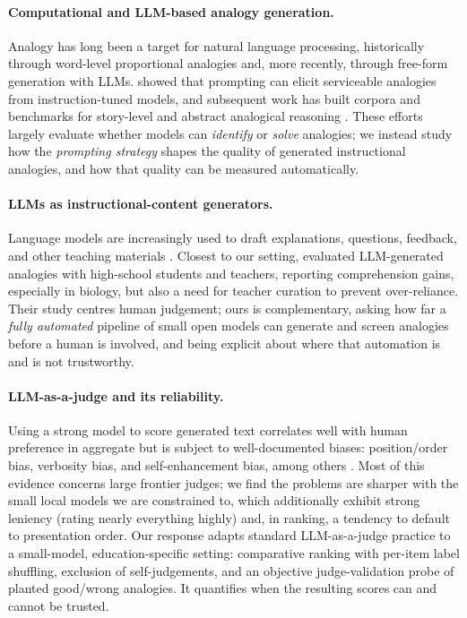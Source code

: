 \documentclass[11pt]{article}
\begin{document}
\paragraph{Computational and LLM-based analogy generation.}
Analogy has long been a target for natural language processing, historically through
word-level proportional analogies and, more recently, through free-form generation with
LLMs. \citet{bhavya2022analogy} showed that prompting can elicit serviceable analogies
from instruction-tuned models, and subsequent work has built corpora and benchmarks for
story-level and abstract analogical reasoning \citep{jiayang2023storyanalogy,ye2024analobench}.
These efforts largely evaluate whether models can \emph{identify} or \emph{solve} analogies;
we instead study how the \emph{prompting strategy} shapes the quality of generated
instructional analogies, and how that quality can be measured automatically.

\paragraph{LLMs as instructional-content generators.}
Language models are increasingly used to draft explanations, questions, feedback, and
other teaching materials \citep{kasneci2023chatgpt}. Closest to our setting,
\citet{shao2025unlocking} evaluated LLM-generated analogies with high-school students and
teachers, reporting comprehension gains, especially in biology, but also a need for
teacher curation to prevent over-reliance. Their study centres human judgement; ours is
complementary, asking how far a \emph{fully automated} pipeline of small open models can
generate and screen analogies before a human is involved, and being explicit about where
that automation is and is not trustworthy.

\paragraph{LLM-as-a-judge and its reliability.}
Using a strong model to score generated text correlates well with human preference in
aggregate but is subject to well-documented biases: position/order bias, verbosity bias,
and self-enhancement bias, among others \citep{zheng2023judging}. Most of this evidence
concerns large frontier judges; we find the problems are sharper with the small local
models we are constrained to, which additionally exhibit strong leniency (rating nearly
everything highly) and, in ranking, a tendency to default to presentation order. Our
response adapts standard LLM-as-a-judge practice to a small-model, education-specific
setting: comparative ranking with per-item label shuffling, exclusion of self-judgements,
and an objective judge-validation probe of planted good/wrong analogies. It quantifies when
the resulting scores can and cannot be trusted.
\end{document}
